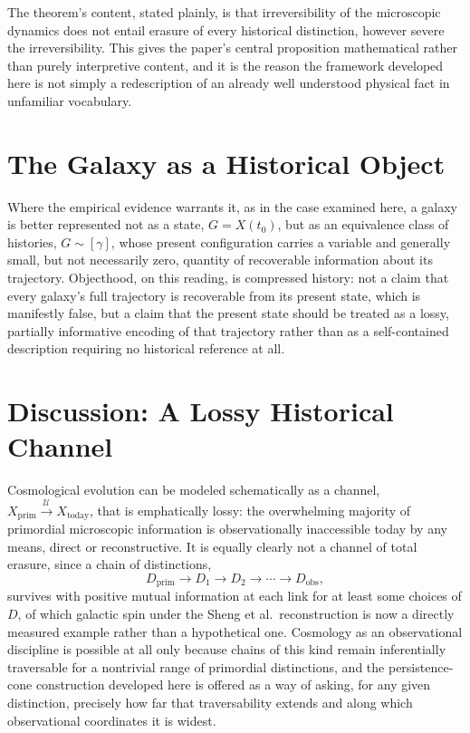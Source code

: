 \documentclass[11pt]{article}
\begin{document}
The theorem's content, stated plainly, is that irreversibility of the microscopic dynamics does not entail erasure of every historical distinction, however severe the irreversibility. This gives the paper's central proposition mathematical rather than purely interpretive content, and it is the reason the framework developed here is not simply a redescription of an already well understood physical fact in unfamiliar vocabulary.

\section{The Galaxy as a Historical Object}

Where the empirical evidence warrants it, as in the case examined here, a galaxy is better represented not as a state, $G = X(t_0)$, but as an equivalence class of histories, $G \sim [\gamma]$, whose present configuration carries a variable and generally small, but not necessarily zero, quantity of recoverable information about its trajectory. Objecthood, on this reading, is compressed history: not a claim that every galaxy's full trajectory is recoverable from its present state, which is manifestly false, but a claim that the present state should be treated as a lossy, partially informative encoding of that trajectory rather than as a self-contained description requiring no historical reference at all.

\section{Discussion: A Lossy Historical Channel}

Cosmological evolution can be modeled schematically as a channel, $X_{\mathrm{prim}} \xrightarrow{\mathcal U} X_{\mathrm{today}}$, that is emphatically lossy: the overwhelming majority of primordial microscopic information is observationally inaccessible today by any means, direct or reconstructive. It is equally clearly not a channel of total erasure, since a chain of distinctions,
\begin{equation}
D_{\mathrm{prim}} \to D_1 \to D_2 \to \cdots \to D_{\mathrm{obs}},
\end{equation}
survives with positive mutual information at each link for at least some choices of $D$, of which galactic spin under the Sheng et al.\ reconstruction is now a directly measured example rather than a hypothetical one. Cosmology as an observational discipline is possible at all only because chains of this kind remain inferentially traversable for a nontrivial range of primordial distinctions, and the persistence-cone construction developed here is offered as a way of asking, for any given distinction, precisely how far that traversability extends and along which observational coordinates it is widest.
\end{document}
